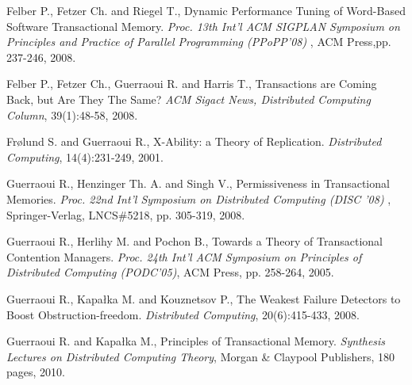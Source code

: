 \begin{thebibliography}{99}
{%
Felber P.,  Fetzer Ch. and  Riegel T., 
Dynamic Performance Tuning of Word-Based Software Transactional Memory. 
{\it  Proc. 13th  Int'l  ACM SIGPLAN Symposium on Principles and
 Practice of Parallel Programming (PPoPP'08) },  ACM Press,pp. 237-246,  2008. 




Felber P., Fetzer Ch., Guerraoui R. and Harris T., 
Transactions are Coming Back, but Are They The Same?
{\it ACM Sigact News, Distributed  Computing Column}, 39(1):48-58, 2008.

Fr{\o}lund S. and Guerraoui R.,
X-Ability: a Theory of Replication.
{\it Distributed Computing}, 14(4):231-249, 2001. 



Guerraoui R.,  Henzinger Th. A. and Singh V., 
Permissiveness in Transactional Memories. 
{\it  Proc. 22nd  Int'l  Symposium on Distributed Computing
(DISC '08) },  Springer-Verlag, LNCS\#5218, pp. 305-319,  2008. 



Guerraoui R.,  Herlihy M. and  Pochon B., 
 Towards a Theory of Transactional Contention Managers. 
{\it  Proc. 24th  Int'l  ACM Symposium on Principles of  Distributed 
Computing (PODC'05)},  ACM Press, pp. 258-264,  2005. 




Guerraoui R., Kapa\l{}ka M. and  Kouznetsov P., 
The Weakest Failure Detectors to Boost Obstruction-freedom. 
{\it Distributed Computing}, 20(6):415-433, 2008. 


Guerraoui R. and  Kapa\l{}ka M.,
Principles of Transactional Memory. 
{\it Synthesis Lectures on Distributed Computing Theory},
 Morgan \& Claypool Publishers, 180 pages, 2010. 




}
\end{thebibliography}
